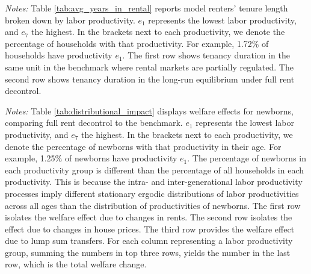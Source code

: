 \documentclass[parskip=full]{article}
\newenvironment{fignote2}[1]
{
\par
\medskip
\begin{minipage}{#1}
\footnotesize
}
{
\end{minipage}
}
\begin{document}
\begin{table}[H]
    \centering
    \caption{Avg. years in same rental unit by labor productivity for all renters}
    \vspace{-0.5cm}
    \label{tab:avg_years_in_rental}
    
    \vspace{-0.45cm}
    \begin{fignote2}{1.04\textwidth}
      \textit{Notes:} Table \ref{tab:avg_years_in_rental} reports model renters' tenure length broken down by labor productivity. $e_{1}$ represents the lowest labor productivity, and $e_{7}$ the highest. In the brackets next to each productivity, we denote the percentage of households with that productivity. For example, 1.72\% of households have productivity $e_{1}$. The first row shows tenancy duration in the same unit in the benchmark where rental markets are partially regulated. The second row shows tenancy duration in the long-run equilibrium under full rent decontrol.
    \end{fignote2}
\end{table}

\begin{table}[H]
    \centering
    \caption{Welfare changes of newborns by labor productivity due to full rent decontrol}
    \vspace{-0.5cm}
    \label{tab:distributional_impact}
    
    \vspace{-0.45cm}
    \begin{fignote2}{0.95\textwidth}
      \textit{Notes:} Table \ref{tab:distributional_impact} displays welfare effects for newborns, comparing full rent decontrol to the benchmark. $e_{1}$ represents the lowest labor productivity, and $e_{7}$ the highest. In the brackets next to each productivity, we denote the percentage of newborns with that productivity in their age. For example, 1.25\% of newborns have productivity $e_{1}$. The percentage of newborns in each productivity group is different than the percentage of all households in each productivity. This is because the intra- and inter-generational labor productivity processes imply different stationary ergodic distributions of labor productivities across all ages than the distribution of productivities of newborns. The first row isolates the welfare effect due to changes in rents. The second row isolates the effect due to changes in house prices. The third row provides the welfare effect due to lump sum transfers. For each column representing a labor productivity group, summing the numbers in top three rows, yields the number in the last row, which is the total welfare change.
    \end{fignote2}
\end{table}
\end{document}
